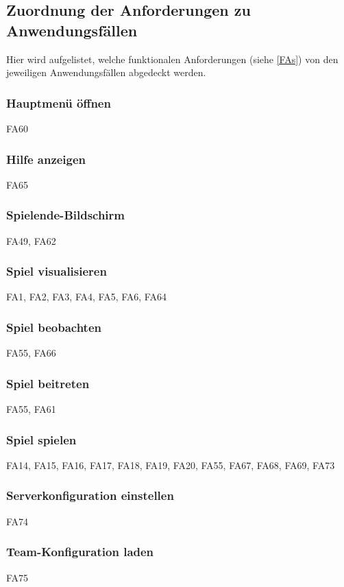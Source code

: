 \subsection{Zuordnung der Anforderungen zu Anwendungsfällen}
Hier wird aufgelistet, welche funktionalen Anforderungen (siehe \ref{FAs}) von den jeweiligen Anwendungsfällen abgedeckt werden.
\subsubsection{Hauptmenü öffnen}
FA60

\subsubsection{Hilfe anzeigen}
FA65

\subsubsection{Spielende-Bildschirm}
FA49,
FA62

\subsubsection{Spiel visualisieren}
FA1,
FA2, 
FA3, 
FA4, 
FA5, 
FA6, 
FA64

\subsubsection{Spiel beobachten}
FA55,
FA66

\subsubsection{Spiel beitreten}
FA55,
FA61

\subsubsection{Spiel spielen}
FA14, 
FA15, 
FA16, 
FA17, 
FA18, 
FA19, 
FA20, 
FA55, 
FA67,
FA68, 
FA69,
FA73 

\subsubsection{Serverkonfiguration einstellen}
FA74 

\subsubsection{Team-Konfiguration laden}
FA75 

